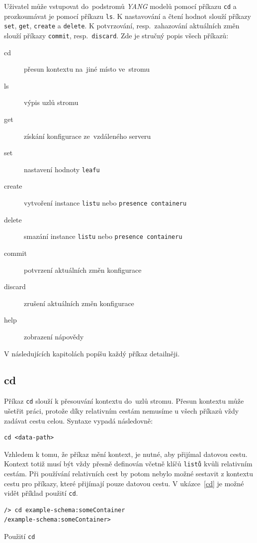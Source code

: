 \documentclass[thesis=B,czech,hidelinks]{FITthesis}[2019/03/06]
\begin{document}
Uživatel může vstupovat do~podstromů \textit{YANG} modelů pomocí příkazu \texttt{cd} a prozkoumávat je pomocí příkazu \texttt{ls}. K nastavování a čtení hodnot slouží příkazy \texttt{set}, \texttt{get}, \texttt{create} a \texttt{delete}. K potvrzování, resp.\ zahazování aktuálních změn slouží příkazy \texttt{commit}, resp.\ \texttt{discard}. Zde je stručný popis všech příkazů:
\begin{description}
\item[cd]{přesun kontextu na~jiné místo ve~stromu}
\item[ls]{výpis uzlů stromu}
\item[get]{získání konfigurace ze~vzdáleného serveru}
\item[set]{nastavení hodnoty \texttt{leafu}}
\item[create]{vytvoření instance \texttt{listu} nebo \texttt{presence containeru}}
\item[delete]{smazání instance \texttt{listu} nebo \texttt{presence containeru}}
\item[commit]{potvrzení aktuálních změn konfigurace}
\item[discard]{zrušení aktuálních změn konfigurace}
\item[help]{zobrazení nápovědy}
\end{description}

V následujících kapitolách popíšu každý příkaz detailněji.

\subsection{cd}
Příkaz \texttt{cd} slouží k přesouvání kontextu do~uzlů stromu. Přesun kontextu může ušetřit práci, protože díky relativním cestám nemusíme u všech příkazů vždy zadávat cestu celou. Syntaxe vypadá následovně:
\begin{verbatim}
cd <data-path>
\end{verbatim}
Vzhledem k tomu, že příkaz mění kontext, je nutné, aby přijímal datovou cestu. Kontext totiž musí být vždy přesně definován včetně klíčů \texttt{listů} kvůli relativním cestám. Při používání relativních cest by potom nebylo možné sestavit z kontextu cestu pro příkazy, které přijímají pouze datovou cestu. V ukázce~\ref{cd} je možné vidět příklad použití \texttt{cd}.

\begin{listing}[H]
\begin{verbatim}
/> cd example-schema:someContainer
/example-schema:someContainer>
\end{verbatim}
\caption{Použití \texttt{cd}}\label{cd}
\end{listing}
\end{document}
